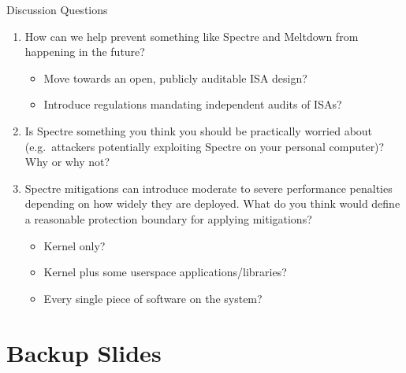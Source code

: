 \documentclass[10pt, dvipsnames, aspectratio=169]{beamer}
\begin{document}
\begin{frame}[c]{Discussion Questions}
  \begin{enumerate}
    \item How can we help prevent something like Spectre and Meltdown from happening in the future?
    \begin{itemize}
      \item Move towards an open, publicly auditable ISA design?
      \item Introduce regulations mandating independent audits of ISAs?
    \end{itemize}

    \vfill
    \item Is Spectre something you think you should be practically worried about (e.g.~attackers potentially exploiting Spectre on your personal computer)? Why or why not?

    \vfill
    \item Spectre mitigations can introduce moderate to severe performance penalties depending on how widely they are deployed. What do you think would define a reasonable protection boundary for applying mitigations?
    \begin{itemize}
      \item Kernel only?
      \item Kernel plus some userspace applications/libraries?
      \item Every single piece of software on the system?
    \end{itemize}
  \end{enumerate}
\end{frame}

\appendix

\section{Backup Slides}
\end{document}
